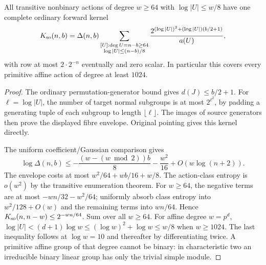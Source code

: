 \begin{theorem}
\label{thm:small-order-consumer}
All transitive nonbinary actions of degree $w\geq64$ with
$\log|U|\leq w/8$ have one complete ordinary forward kernel
\[
 K_{\rm so}(n,b)=\Delta(n,b)
 \sum_{\substack{[U]:\deg U=n-b\geq64\\\log|U|\leq(n-b)/8}}
 \frac{2^{(\log|U|)^2+(\log|U|)(b/2+1)}}{a(U)},
\]
with row at most $2\cdot2^{-n}$ eventually and zero scalar.
In particular this covers every primitive affine action of
degree at least $1024$.
\end{theorem}
\begin{proof}
The ordinary permutation-generator bound
\cite[Proposition 2.1]{HoltRoneyDougal2013} gives
$d(J)\leq b/2+1$. For $\ell=\log|U|$, the number of target
normal subgroups is at most $2^{\ell^2}$, by padding a generating
tuple of each subgroup to length $\lfloor\ell\rfloor$.
The images of source generators then prove the displayed fibre
envelope. Original pointing gives this kernel directly.

The uniform coefficient/Gaussian comparison gives
\[
 \log\Delta(n,b)\leq-\frac{(w-(w\bmod2))b}{8}
             -\frac{w^2}{16}+O(w\log(n+2)).
\]
The envelope costs at most $w^2/64+wb/16+w/8$.
The action-class entropy is $o(w^2)$ by the transitive
enumeration theorem. For $w\geq64$, the negative terms are
at most $-wn/32-w^2/64$; uniformly absorb class entropy into
$w^2/128+O(w)$ and the remaining terms into $wn/64$.
Hence $K_{\rm so}(n,n-w)\leq2^{-wn/64}$. Sum over all
$w\geq64$.
For affine degree $w=p^d$, $\log|U|<(d+1)\log w
\leq(\log w)^2+\log w\leq w/8$ when $w\geq1024$.
The last inequality follows at $\log w=10$ and thereafter
by differentiating twice. A primitive affine group of that
degree cannot be binary: in characteristic two an irreducible
binary linear group has only the trivial simple module.
\end{proof}

